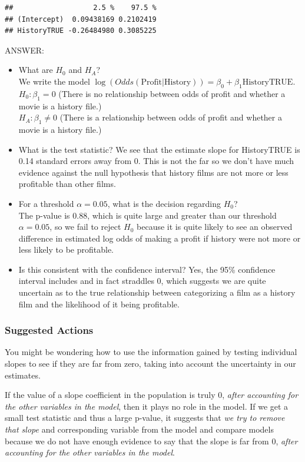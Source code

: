 \documentclass[
]{book}
\begin{document}
\begin{verbatim}
##                   2.5 %    97.5 %
## (Intercept)  0.09438169 0.2102419
## HistoryTRUE -0.26484980 0.3085225
\end{verbatim}

ANSWER:

\begin{itemize}
\item
  What are \(H_0\) and \(H_A\)?\\
  We write the model \(\log(Odds(\text{Profit}|\text{History})) = \beta_0 + \beta_1\text{HistoryTRUE}\).\\
  \(H_0: \beta_1 = 0\) (There is no relationship between odds of profit and whether a movie is a history file.)\\
  \(H_A: \beta_1 \neq 0\) (There is a relationship between odds of profit and whether a movie is a history file.)
\item
  What is the test statistic?
  We see that the estimate slope for HistoryTRUE is 0.14 standard errors away from 0. This is not the far so we don't have much evidence against the null hypothesis that history films are not more or less profitable than other films.
\item
  For a threshold \(\alpha = 0.05\), what is the decision regarding \(H_0\)?\\
  The p-value is 0.88, which is quite large and greater than our threshold \(\alpha = 0.05\), so we fail to reject \(H_0\) because it is quite likely to see an observed difference in estimated log odds of making a profit if history were not more or less likely to be profitable.
\item
  Is this consistent with the confidence interval?
  Yes, the 95\% confidence interval includes and in fact straddles 0, which suggests we are quite uncertain as to the true relationship between categorizing a film as a history film and the likelihood of it being profitable.
\end{itemize}

\subsubsection{Suggested Actions}\label{suggested-actions}

You might be wondering how to use the information gained by testing individual slopes to see if they are far from zero, taking into account the uncertainty in our estimates.

If the value of a slope coefficient in the population is truly 0, \emph{after accounting for the other variables in the model}, then it plays no role in the model. If we get a small test statistic and thus a large p-value, it suggests that \emph{we try to remove that slope} and corresponding variable from the model and compare models because we do not have enough evidence to say that the slope is far from 0, \emph{after accounting for the other variables in the model}.
\end{document}
